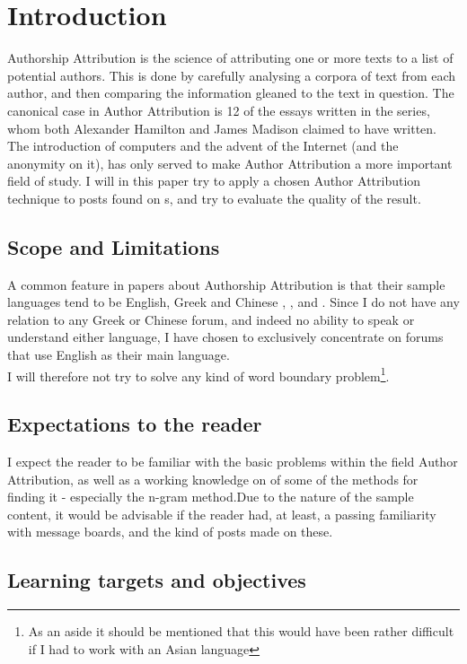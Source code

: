 \section{Introduction}
\label{introduction}
Authorship Attribution is the science of attributing one or more texts to a list of potential authors. This is done by carefully analysing a corpora of text from each author, and then comparing the information gleaned to the text in question. The canonical case in Author Attribution is 12 of the essays written in the  series, whom both Alexander Hamilton and James Madison claimed to have written. The introduction of computers and the advent of the Internet (and the anonymity on it), has only served to make Author Attribution a more important field of study. I will in this paper try to apply a chosen Author Attribution technique to posts found on \forum s, and try to evaluate the quality of the result.  

\subsection{Scope and Limitations}
\label{scope}
A common feature in papers about Authorship Attribution is that their sample languages tend to be English, Greek and Chinese \cite{syntactic}, \cite{nr2}, \cite{nr4} and \cite{app-spe}. Since I do not have any relation to any Greek or Chinese forum, and indeed no ability to speak or understand either language, I have chosen to exclusively concentrate on forums that use English as their main language.\\
I will therefore not try to solve any kind of word boundary problem\footnote{As an aside it should be mentioned that this would have been rather difficult if I had to work with an Asian language}.

\subsection{Expectations to the reader}
\label{expectations}
I expect the reader to be familiar with the basic problems within the field Author Attribution, as well as a working knowledge on of some of the methods for finding it - especially the n-gram method.Due to the nature of the sample content, it would be advisable if the reader had, at least, a passing familiarity with message boards, and the kind of posts made on these.

\subsection{Learning targets and objectives}
\label{lerning}
